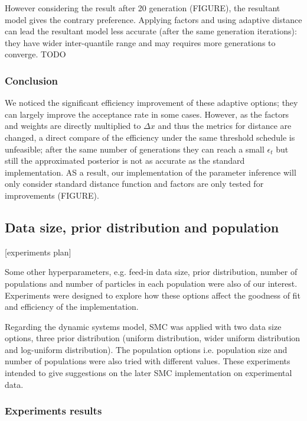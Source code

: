 However considering the result after 20 generation (FIGURE), the resultant model gives the contrary preference. Applying factors and using adaptive distance can lead the resultant model less accurate (after the same generation iterations): they have wider inter-quantile range and may requires more generations to converge. TODO


\subsubsection{Conclusion} We noticed the significant efficiency improvement of these adaptive options; they can largely improve the acceptance rate in some cases. However, as the factors and weights are directly multiplied to $\Delta x$ and thus the metrics for distance are changed, a direct compare of the efficiency under the same threshold schedule is unfeasible; after the same number of generations they can reach a small $\epsilon_t$ but still the approximated posterior is not as accurate as the standard implementation. AS a result, our implementation of the parameter inference will only consider standard distance function and factors are only tested for improvements (FIGURE).


\subsection{Data size, prior distribution and population}

[experiments plan]

Some other hyperparameters, e.g. feed-in data size, prior distribution, number of populations and number of particles in each population were also of our interest. Experiments were designed to explore how these options affect the goodness of fit and efficiency of the implementation.

Regarding the dynamic systems model, SMC was applied with two data size options, three prior distribution (uniform distribution, wider uniform distribution and log-uniform distribution). The population options i.e. population size and number of populations were also tried with different values. These experiments intended to give suggestions on the later SMC implementation on experimental data.

\subsubsection{Experiments results}

